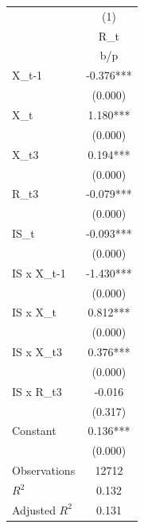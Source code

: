 {
\def\sym#1{\ifmmode^{#1}\else\(^{#1}\)\fi}
\begin{tabular}{l*{1}{c}}
\hline\hline
                    &\multicolumn{1}{c}{(1)}\\
                    &\multicolumn{1}{c}{R\_t}\\
                    &         b/p   \\
\hline
X\_t-1               &      -0.376***\\
                    &     (0.000)   \\
X\_t                 &       1.180***\\
                    &     (0.000)   \\
X\_t3                &       0.194***\\
                    &     (0.000)   \\
R\_t3                &      -0.079***\\
                    &     (0.000)   \\
IS\_t                &      -0.093***\\
                    &     (0.000)   \\
IS x X\_t-1          &      -1.430***\\
                    &     (0.000)   \\
IS x X\_t            &       0.812***\\
                    &     (0.000)   \\
IS x X\_t3           &       0.376***\\
                    &     (0.000)   \\
IS x R\_t3           &      -0.016   \\
                    &     (0.317)   \\
Constant            &       0.136***\\
                    &     (0.000)   \\
\hline
Observations        &       12712   \\
\(R^{2}\)           &       0.132   \\
Adjusted \(R^{2}\)  &       0.131   \\
\hline\hline
\end{tabular}
}
